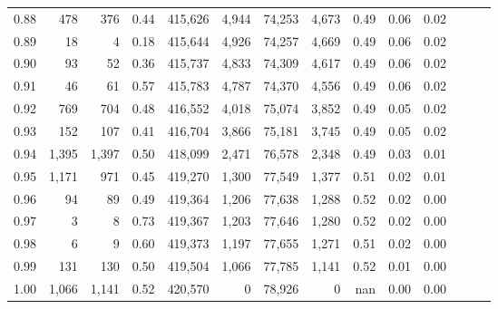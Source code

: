 \begin{tabular}{rrrrrrrrrrrrrr}
0.88 &     478 &    376 &  0.44 &  415,626 &    4,944 &  74,253 &   4,673 &  0.49 &  0.06 &      0.02 \\
0.89 &      18 &      4 &  0.18 &  415,644 &    4,926 &  74,257 &   4,669 &  0.49 &  0.06 &      0.02 \\
0.90 &      93 &     52 &  0.36 &  415,737 &    4,833 &  74,309 &   4,617 &  0.49 &  0.06 &      0.02 \\
0.91 &      46 &     61 &  0.57 &  415,783 &    4,787 &  74,370 &   4,556 &  0.49 &  0.06 &      0.02 \\
0.92 &     769 &    704 &  0.48 &  416,552 &    4,018 &  75,074 &   3,852 &  0.49 &  0.05 &      0.02 \\
0.93 &     152 &    107 &  0.41 &  416,704 &    3,866 &  75,181 &   3,745 &  0.49 &  0.05 &      0.02 \\
0.94 &   1,395 &  1,397 &  0.50 &  418,099 &    2,471 &  76,578 &   2,348 &  0.49 &  0.03 &      0.01 \\
0.95 &   1,171 &    971 &  0.45 &  419,270 &    1,300 &  77,549 &   1,377 &  0.51 &  0.02 &      0.01 \\
0.96 &      94 &     89 &  0.49 &  419,364 &    1,206 &  77,638 &   1,288 &  0.52 &  0.02 &      0.00 \\
0.97 &       3 &      8 &  0.73 &  419,367 &    1,203 &  77,646 &   1,280 &  0.52 &  0.02 &      0.00 \\
0.98 &       6 &      9 &  0.60 &  419,373 &    1,197 &  77,655 &   1,271 &  0.51 &  0.02 &      0.00 \\
0.99 &     131 &    130 &  0.50 &  419,504 &    1,066 &  77,785 &   1,141 &  0.52 &  0.01 &      0.00 \\
1.00 &   1,066 &  1,141 &  0.52 &  420,570 &        0 &  78,926 &       0 &   nan &  0.00 &      0.00 \\
\bottomrule
\end{tabular}
